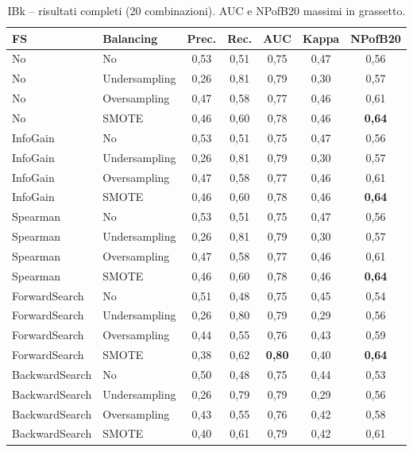 \begin{table}[h!]
\centering
\small
\begin{tabular}{@{}llccccc@{}}
\toprule
\textbf{FS} & \textbf{Balancing} & \textbf{Prec.} & \textbf{Rec.} &
\textbf{AUC} & \textbf{Kappa} & \textbf{NPofB20} \\
\midrule
No             & No            & 0,53 & 0,51 & 0,75 & 0,47 & 0,56 \\
No             & Undersampling & 0,26 & 0,81 & 0,79 & 0,30 & 0,57 \\
No             & Oversampling  & 0,47 & 0,58 & 0,77 & 0,46 & 0,61 \\
No             & SMOTE         & 0,46 & 0,60 & 0,78 & 0,46 & \textbf{0,64} \\
InfoGain       & No            & 0,53 & 0,51 & 0,75 & 0,47 & 0,56 \\
InfoGain       & Undersampling & 0,26 & 0,81 & 0,79 & 0,30 & 0,57 \\
InfoGain       & Oversampling  & 0,47 & 0,58 & 0,77 & 0,46 & 0,61 \\
InfoGain       & SMOTE         & 0,46 & 0,60 & 0,78 & 0,46 & \textbf{0,64} \\
Spearman       & No            & 0,53 & 0,51 & 0,75 & 0,47 & 0,56 \\
Spearman       & Undersampling & 0,26 & 0,81 & 0,79 & 0,30 & 0,57 \\
Spearman       & Oversampling  & 0,47 & 0,58 & 0,77 & 0,46 & 0,61 \\
Spearman       & SMOTE         & 0,46 & 0,60 & 0,78 & 0,46 & \textbf{0,64} \\
ForwardSearch  & No            & 0,51 & 0,48 & 0,75 & 0,45 & 0,54 \\
ForwardSearch  & Undersampling & 0,26 & 0,80 & 0,79 & 0,29 & 0,56 \\
ForwardSearch  & Oversampling  & 0,44 & 0,55 & 0,76 & 0,43 & 0,59 \\
ForwardSearch  & SMOTE         & 0,38 & 0,62 & \textbf{0,80} & 0,40 & \textbf{0,64} \\
BackwardSearch & No            & 0,50 & 0,48 & 0,75 & 0,44 & 0,53 \\
BackwardSearch & Undersampling & 0,26 & 0,79 & 0,79 & 0,29 & 0,56 \\
BackwardSearch & Oversampling  & 0,43 & 0,55 & 0,76 & 0,42 & 0,58 \\
BackwardSearch & SMOTE         & 0,40 & 0,61 & 0,79 & 0,42 & 0,61 \\
\bottomrule
\end{tabular}
\caption{IBk -- risultati completi (20 combinazioni). AUC e NPofB20 massimi in grassetto.}
\label{tab:r2-ibk-full}
\end{table}


